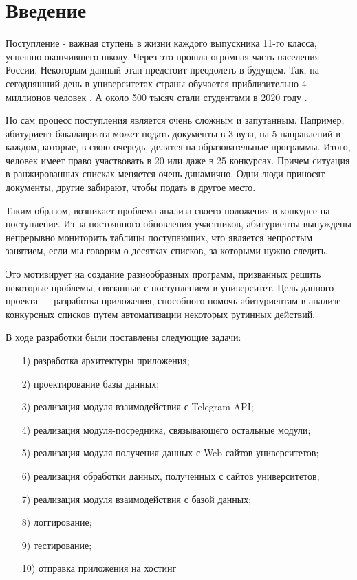 \documentclass[a4paper,article,14pt]{extarticle}
\begin{document}


\tableofcontents
\pagebreak

\section{Введение}
Поступление - важная ступень в жизни каждого выпускника 11-го класса, успешно окончившего школу. Через это прошла огромная часть населения России. Некоторым данный этап предстоит преодолеть в будущем. Так, на сегодняшний день в университетах страны обучается приблизительно 4 миллионов человек \cite{abitstats}. А около 500 тысяч стали студентами в 2020 году \cite{abitstats}.

Но сам процесс поступления является очень сложным и запутанным. Например, абитуриент бакалавриата может подать документы в 3 вуза, на 5 направлений в каждом, которые, в свою очередь, делятся на образовательные программы. Итого, человек имеет право участвовать в 20 или даже в 25 конкурсах. Причем ситуация в ранжированных списках меняется очень динамично. Одни люди приносят документы, другие забирают, чтобы подать в другое место.

Таким образом, возникает проблема анализа своего положения в конкурсе на поступление. Из-за постоянного обновления участников, абитуриенты вынуждены непрерывно мониторить таблицы поступающих, что является непростым занятием, если мы говорим о десятках списков, за которыми нужно следить.

Это мотивирует на создание разнообразных программ, призванных решить некоторые проблемы, связанные с поступлением в университет. Цель данного проекта — разработка приложения, способного помочь абитуриентам в анализе конкурсных списков путем автоматизации некоторых рутинных действий.

В ходе разработки были поставлены следующие задачи:
\begin{itemize}
\item[1)] разработка архитектуры приложения;

\item[2)] проектирование базы данных;

\item[3)] реализация модуля взаимодействия с Telegram API;

\item[4)] реализация модуля-посредника, связывающего остальные модули;

\item[5)] реализация модуля получения данных с Web-сайтов университетов;

\item[6)] реализация обработки данных, полученных с сайтов университетов;

\item[7)] реализация модуля взаимодействия с базой данных;

\item[8)] логгирование;

\item[9)] тестирование;

\item[10)] отправка приложения на хостинг
\end{itemize}
\end{document}
